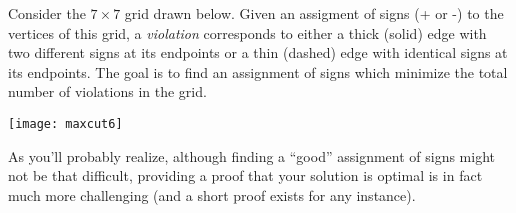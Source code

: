 \documentclass[12pt]{article}
\begin{document}

Consider the
$7\times 7$ grid drawn below. Given an assigment of
signs (+ or -) to the vertices of this grid, a {\it violation}
corresponds to either a thick (solid) edge with two different signs at its
endpoints or a  thin (dashed) edge with identical signs at its
endpoints. The goal is to find an assignment of signs which minimize
the total number of violations in the grid. 

\begin{center}
\texttt{[image: maxcut6]}
\end{center}

As you'll probably realize, although finding a ``good'' assignment of
signs might not be that difficult, providing a proof  that your
solution is optimal is in fact much more challenging (and a short proof exists for any instance). 


\end{document}
